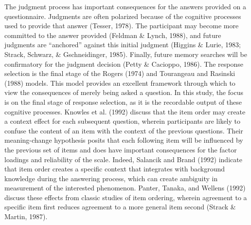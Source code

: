 \documentclass[english,man]{apa6}
\theoremstyle{definition}
\theoremstyle{definition}
\theoremstyle{definition}
\theoremstyle{remark}
\begin{document}
The judgment process has important consequences for the answers provided
on a questionnaire. Judgments are often polarized because of the
cognitive processes used to provide that answer (Tesser, 1978). The
participant may become more committed to the answer provided (Feldman \&
Lynch, 1988), and future judgments are \enquote{anchored} against this
initial judgment (Higgins \& Lurie, 1983; Strack, Schwarz, \&
Gschneidinger, 1985). Finally, future memory searches will be
confirmatory for the judgment decision (Petty \& Cacioppo, 1986). The
response selection is the final stage of the Rogers (1974) and
Tourangeau and Rasinski (1988) models. This model provides an excellent
framework through which to view the consequences of merely being asked a
question. In this study, the focus is on the final stage of response
selection, as it is the recordable output of these cognitive processes.
Knowles et al. (1992) discuss that the item order may create a context
effect for each subsequent question, wherein participants are likely to
confuse the content of an item with the context of the previous
questions. Their meaning-change hypothesis posits that each following
item will be influenced by the previous set of items and does have
important consequences for the factor loadings and reliability of the
scale. Indeed, Salancik and Brand (1992) indicate that item order
creates a specific context that integrates with background knowledge
during the answering process, which can create ambiguity in measurement
of the interested phenomenon. Panter, Tanaka, and Wellens (1992) discuss
these effects from classic studies of item ordering, wherein agreement
to a specific item first reduces agreement to a more general item second
(Strack \& Martin, 1987).
\end{document}
